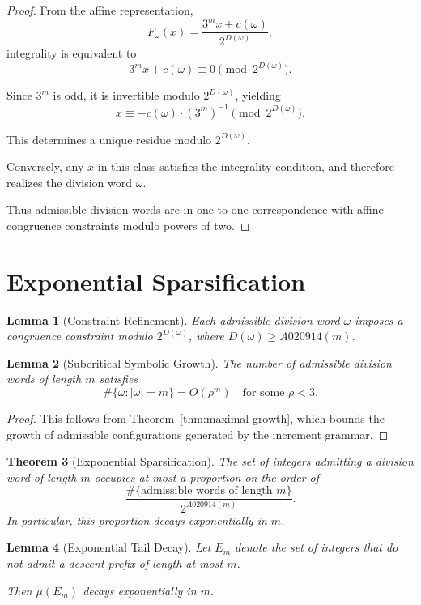 \documentclass[12pt, oneside]{article}
\numberwithin{equation}{section}
\theoremstyle{definition}
\theoremstyle{plain}
\newtheorem{theorem}{Theorem}[section]
\newtheorem{lemma}[theorem]{Lemma}
\theoremstyle{remark}
\begin{document}
\begin{proof}
From the affine representation,
\[
F_\omega(x) = \frac{3^m x + c(\omega)}{2^{D(\omega)}},
\]
integrality is equivalent to
\[
3^m x + c(\omega) \equiv 0 \pmod{2^{D(\omega)}}.
\]

Since $3^m$ is odd, it is invertible modulo $2^{D(\omega)}$, yielding
\[
x \equiv -c(\omega) \cdot (3^m)^{-1} \pmod{2^{D(\omega)}}.
\]

This determines a unique residue modulo $2^{D(\omega)}$.

Conversely, any $x$ in this class satisfies the integrality condition,
and therefore realizes the division word $\omega$.

Thus admissible division words are in one-to-one correspondence with affine
congruence constraints modulo powers of two.
\end{proof}

\section{Exponential Sparsification}
\label{sec:exponential-sparsification}

\begin{lemma}[Constraint Refinement]
Each admissible division word $\omega$ imposes a congruence constraint
modulo $2^{D(\omega)}$, where $D(\omega) \ge A020914(m)$.
\end{lemma}

\begin{lemma}[Subcritical Symbolic Growth]
The number of admissible division words of length $m$ satisfies
\[
\#\{\omega : |\omega|=m\} = O(\rho^m)
\quad \text{for some } \rho < 3.
\]
\end{lemma}

\begin{proof}
This follows from Theorem~\ref{thm:maximal-growth}, which bounds the growth
of admissible configurations generated by the increment grammar.
\end{proof}

\begin{theorem}[Exponential Sparsification]
The set of integers admitting a division word of length $m$ occupies at most
a proportion on the order of
\[
\frac{\#\{\text{admissible words of length } m\}}{2^{A020914(m)}}.
\]
In particular, this proportion decays exponentially in $m$.
\end{theorem}

\begin{lemma}[Exponential Tail Decay]
Let $E_m$ denote the set of integers that do not admit a descent prefix
of length at most $m$.

Then $\mu(E_m)$ decays exponentially in $m$.
\end{lemma}
\end{document}
